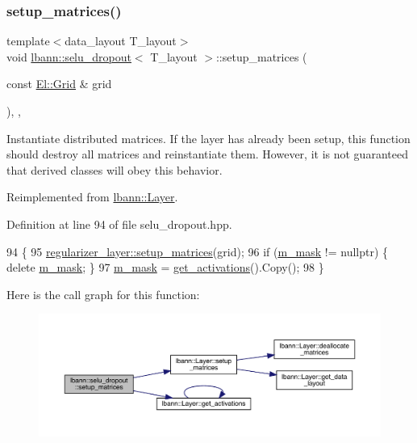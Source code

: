 \subsubsection{\texorpdfstring{setup\+\_\+matrices()}{setup\_matrices()}}
{\footnotesize\ttfamily template$<$data\+\_\+layout T\+\_\+layout$>$ \\
void \hyperlink{classlbann_1_1selu__dropout}{lbann\+::selu\+\_\+dropout}$<$ T\+\_\+layout $>$\+::setup\+\_\+matrices (\begin{DoxyParamCaption}\item[{const \hyperlink{base_8hpp_a9951bb1719d534e0401b1f06cad19eab}{El\+::\+Grid} \&}]{grid }\end{DoxyParamCaption})\hspace{0.3cm}{\ttfamily [inline]}, {\ttfamily [override]}, {\ttfamily [virtual]}}

Instantiate distributed matrices. If the layer has already been setup, this function should destroy all matrices and reinstantiate them. However, it is not guaranteed that derived classes will obey this behavior. 

Reimplemented from \hyperlink{classlbann_1_1Layer_a57bbe21131dc00ab5cf9ea5e3656808e}{lbann\+::\+Layer}.



Definition at line 94 of file selu\+\_\+dropout.\+hpp.


\begin{DoxyCode}
94                                                    \{
95     \hyperlink{classlbann_1_1Layer_a57bbe21131dc00ab5cf9ea5e3656808e}{regularizer\_layer::setup\_matrices}(grid);
96     \textcolor{keywordflow}{if} (\hyperlink{classlbann_1_1selu__dropout_a31aaadbc51d78673a84390b48d4e5950}{m\_mask} != \textcolor{keyword}{nullptr}) \{ \textcolor{keyword}{delete} \hyperlink{classlbann_1_1selu__dropout_a31aaadbc51d78673a84390b48d4e5950}{m\_mask}; \}
97     \hyperlink{classlbann_1_1selu__dropout_a31aaadbc51d78673a84390b48d4e5950}{m\_mask} = \hyperlink{classlbann_1_1Layer_a1134b1a4385af199d7272c5aa827fa99}{get\_activations}().Copy();    
98   \}
\end{DoxyCode}
Here is the call graph for this function\+:\nopagebreak
\begin{figure}[H]
\begin{center}
\leavevmode
\includegraphics[width=350pt]{classlbann_1_1selu__dropout_a8b6469a14cf093d48e42384aa4ee404a_cgraph}
\end{center}
\end{figure}


